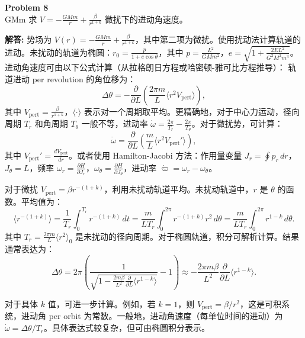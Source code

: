 \documentclass[12pt, a4paper, oneside]{ctexart}
\newenvironment{solution}{\par\noindent\textbf{解答:}\quad}{\par}
\begin{document}
\begin{mdframed}[backgroundcolor=gray!10, linewidth=0pt]
    \textbf{Problem 8} \\
    GMm 求 \(V=-\frac{GMm}{r}+\frac{\beta}{r^{1+k}}\) 微扰下的进动角速度。
\end{mdframed}
\begin{solution}
    势场为 \(V(r) = -\frac{GMm}{r} + \frac{\beta}{r^{1+k}}\)，其中第二项为微扰。使用扰动法计算轨道的进动。未扰动的轨道为椭圆：\(r_0 = \frac{p}{1+e\cos\theta}\)，其中 \(p = \frac{L^2}{GMm^2}\)，\(e = \sqrt{1+\frac{2EL^2}{G^2M^2m^3}}\)。进动角速度可由以下公式计算（从拉格朗日方程或哈密顿-雅可比方程推导）：
    轨道进动 per revolution 的角位移为：
    \[
    \Delta \theta = -\frac{\partial}{\partial L} \left( \frac{2\pi m}{L} \langle r^2 V_{\text{pert}} \rangle \right),
    \]
    其中 \(V_{\text{pert}} = \frac{\beta}{r^{1+k}}\)，\(\langle \cdot \rangle\) 表示对一个周期取平均。更精确地，对于中心力运动，径向周期 \(T_r\) 和角周期 \(T_\theta\) 一般不等，进动率 \(\dot{\omega} = \frac{2\pi}{T_r} - \frac{2\pi}{T_\theta}\)。对于微扰势，可计算：
    \[
    \dot{\omega} = \frac{\partial}{\partial L} \left( \frac{m}{L} \langle r^2 V_{\text{pert}}' \rangle \right),
    \]
    其中 \(V_{\text{pert}}' = \frac{d V_{\text{pert}}}{d r}\)。或者使用 Hamilton-Jacobi 方法：作用量变量 \(J_r = \oint p_r \, dr\)，\(J_\theta = L\)，频率 \(\omega_r = \frac{\partial H}{\partial J_r}\)，\(\omega_\theta = \frac{\partial H}{\partial J_\theta}\)，进动率 \(\dot{\varpi} = \omega_r - \omega_\theta\)。
    
    对于微扰 \(V_{\text{pert}} = \beta r^{-(1+k)}\)，利用未扰动轨道平均。未扰动轨道中，\(r\) 是 \(\theta\) 的函数。平均值为：
    \[
    \langle r^{-(1+k)} \rangle = \frac{1}{T_r} \int_0^{T_r} r^{-(1+k)} \, dt = \frac{m}{L T_r} \int_0^{2\pi} r^{-(1+k)} r^2 \, d\theta = \frac{m}{L T_r} \int_0^{2\pi} r^{1-k} \, d\theta.
    \]
    其中 \(T_r = \frac{2\pi m}{L} \langle r^2 \rangle_0\) 是未扰动的径向周期。对于椭圆轨道，积分可解析计算。结果通常表达为：
    \[
    \Delta \theta = 2\pi \left( \frac{1}{\sqrt{1 - \frac{2m \beta}{L^2} \frac{\partial}{\partial L} \langle r^{1-k} \rangle}} - 1 \right) \approx -\frac{2\pi m \beta}{L^2} \frac{\partial}{\partial L} \langle r^{1-k} \rangle.
    \]
    
    对于具体 \(k\) 值，可进一步计算。例如，若 \(k=1\)，则 \(V_{\text{pert}} = \beta/r^2\)，这是可积系统，进动角 per orbit 为常数。一般地，进动角速度（每单位时间的进动）为 \(\dot{\omega} = \Delta \theta / T_r\)。具体表达式较复杂，但可由椭圆积分表示。
\end{solution}
\end{document}
